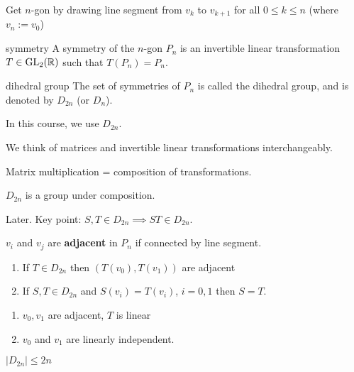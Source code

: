 Get $n$-gon by drawing line segment from $v_k$ to $v_{k+1}$ for all $0\le k\le n$ (where $v_n:=v_0$)

\begin{defn}{symmetry}
A symmetry of the $n$-gon $P_n$ is an invertible linear transformation $T\in \operatorname{GL}_2(\mathbb R)$ such that $T(P_n)=P_n$.
\end{defn}

\begin{defn}{dihedral group}
The set of symmetries of $P_n$ is called the dihedral group, and is denoted by $D_{2n}$ (or $D_n$).
\end{defn}

In this course, we use $D_{2n}$.

\begin{note}
We think of matrices and invertible linear transformations interchangeably.

Matrix multiplication = composition of transformations.
\end{note}

\begin{prop}
$D_{2n}$ is a group under composition.
\end{prop}

\begin{pf}
Later. Key point: $S,T\in D_{2n}\implies ST\in D_{2n}$.
\end{pf}

$v_i$ and $v_j$ are \textbf{adjacent} in $P_n$ if connected by line segment.

\begin{lemma}
\begin{enumerate}
\item If $T\in D_{2n}$ then $(T(v_0), T(v_1))$ are adjacent
\item If $S,T\in D_{2n}$ and $S(v_i)=T(v_i)$, $i=0,1$ then $S=T$.
\end{enumerate}
\end{lemma}

\begin{pf}
\begin{enumerate}
\item $v_0,v_1$ are adjacent, $T$ is linear
\item $v_0$ and $v_1$ are linearly independent.
\end{enumerate}
\end{pf}

\begin{corr}
$|D_{2n}|\le 2n$
\end{corr}

